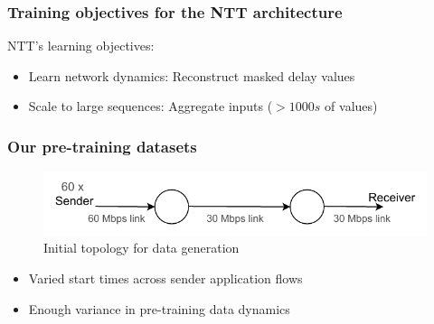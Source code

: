 \documentclass{beamer}
\begin{document}
\begin{frame}
\frametitle{Training objectives for the NTT architecture}

NTT's learning objectives: 
\pause 
\begin{itemize}
    \item<1-> \alert{Learn network dynamics:}  Reconstruct masked delay values
    \pause
    \item<1-> \alert{Scale to large sequences:}  Aggregate inputs ($ > 1000s$ of values)
    \end{itemize}
\end{frame}



\begin{frame}
\frametitle{Our pre-training datasets}


\begin{figure}[h]
  \begin{center}
    \includegraphics[scale=0.8]{figures/simple_topo.pdf}
    \caption{Initial topology for data generation}
    \label{fig:topo}
  \end{center}
\end{figure}
 
 \pause

\begin{itemize}
    \item<1-> Varied start times across sender application flows
    \item<1-> Enough variance in pre-training data dynamics 
    \end{itemize}

\end{frame}
\end{document}
